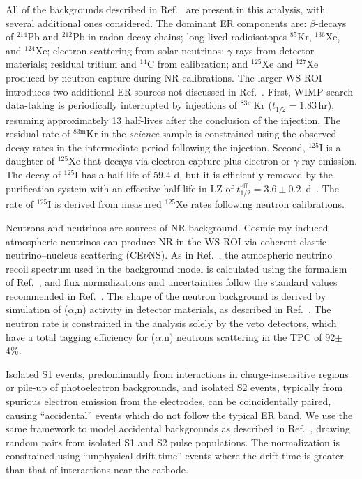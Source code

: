 All of the backgrounds described in Ref.~\cite{LZ:SR3_WS2024} are present in this analysis, with several additional ones considered. The dominant ER components are: $\beta$-decays of $^{214}$Pb and $^{212}$Pb in radon decay chains; long-lived radioisotopes $^{85}$Kr, $^{136}$Xe, and $^{124}$Xe; electron scattering from solar neutrinos; $\gamma$-rays from detector materials; residual tritium and $^{14}$C from calibration; and ${}^{125}$Xe and ${}^{127}$Xe produced by neutron capture during NR calibrations.  
The larger WS ROI introduces two additional ER sources not discussed in Ref.~\cite{LZ:SR3_WS2024}. First, WIMP search data-taking is periodically interrupted by injections of $^{83\mathrm{m}}$Kr ($t_{1/2}=1.83$\,hr), resuming approximately 13 half-lives after the conclusion of the injection. 
The residual rate of $^{83\mathrm{m}}$Kr in the \emph{science} sample is constrained using the observed decay rates in the intermediate period following the injection. Second, ${}^{125}$I is a daughter of ${}^{125}$Xe that decays via electron capture plus electron or $\gamma$-ray emission. 
The decay of  ${}^{125}$I has a half-life of 59.4 d, but it is efficiently removed by the purification system with an effective half-life in LZ of $t_{1/2}^{\mathrm{eff}} = 3.6 \pm 0.2$~d~\cite{LZ:2024wvs}. 
The rate of ${}^{125}$I is derived from measured ${}^{125}$Xe rates following neutron calibrations.

Neutrons and neutrinos are sources of NR background. 
Cosmic-ray-induced atmospheric neutrinos can produce NR in the WS ROI via coherent elastic neutrino--nucleus scattering (CE$\nu$NS).  
As in Ref.~\cite{LZ:SR3_WS2024}, the atmospheric neutrino recoil spectrum used in the background model is calculated using the formalism of Ref.~\cite{Billard:2013qya}, and flux normalizations and uncertainties follow the standard values recommended in Ref.~\cite{DM_parameters:BAXTER2021_Conventions}.
The shape of the neutron background is derived by simulation of ($\alpha$,n) activity in detector materials, as described in Ref.~\cite{LZ:SR3_WS2024}. 
The neutron rate is constrained in the analysis solely by the veto detectors, which have a total tagging efficiency for ($\alpha$,n) neutrons scattering in the TPC of 92$\pm$4\%. 

Isolated S1 events, predominantly from interactions in charge-insensitive regions or pile-up of photoelectron backgrounds, and isolated S2 events, typically from spurious electron emission from the electrodes, can be coincidentally paired, causing ``accidental'' events which do not follow the typical ER band.
We use the same framework to model accidental backgrounds as described in Ref.~\cite{LZ:SR3_WS2024}, drawing random pairs from isolated S1 and S2 pulse populations.
The normalization is constrained using ``unphysical drift time'' events where the drift time is greater than that of interactions near the cathode.

